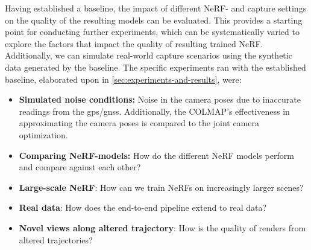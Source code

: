 Having established a baseline, the impact of different NeRF- and capture settings on the quality of the resulting models can be evaluated. This provides a starting point for conducting further experiments, which can be systematically varied to explore the factors that impact the quality of resulting trained NeRF. Additionally, we can simulate real-world capture scenarios using the synthetic data generated by the baseline. The specific experiments ran with the established baseline, elaborated upon in \autoref{sec:experiments-and-results}, were:

\begin{itemize}
    \item \textbf{Simulated noise conditions:} Noise in the camera poses due to inaccurate readings from the \acrshort{gps}/\acrshort{gnss}. Additionally, the COLMAP's effectiveness in approximating the camera poses is compared to the joint camera optimization.
    \item \textbf{Comparing NeRF-models:} How do the different NeRF models perform and compare against each other?
    \item \textbf{Large-scale NeRF}: How can we train NeRFs on increasingly larger scenes?
    \item \textbf{Real data}: How does the end-to-end pipeline extend to real data?
    \item \textbf{Novel views along altered trajectory}: How is the quality of renders from altered trajectories?
\end{itemize}




















































